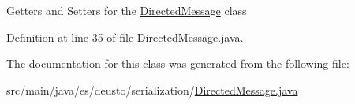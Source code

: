 Getters and Setters for the \hyperlink{classes_1_1deusto_1_1serialization_1_1_directed_message}{Directed\+Message} class 

Definition at line 35 of file Directed\+Message.\+java.



The documentation for this class was generated from the following file\+:\begin{DoxyCompactItemize}
\item 
src/main/java/es/deusto/serialization/\hyperlink{_directed_message_8java}{Directed\+Message.\+java}\end{DoxyCompactItemize}
